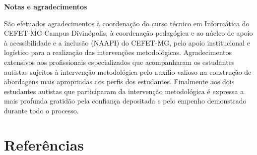 \documentclass[
  12pt,
  a4paper,
]{article}
\begin{document}
\textbf{Notas e agradecimentos}

São efetuados agradecimentos à coordenação do curso técnico em
Informática do CEFET-MG Campus Divinópolis, à coordenação pedagógica e
ao núcleo de apoio à acessibilidade e a inclusão (NAAPI) do CEFET-MG,
pelo apoio institucional e logístico para a realização das intervenções
metodológicas. Agradecimentos extensivos aos profissionais
especializados que acompanharam os estudantes autistas sujeitos à
intervenção metodológica pelo auxílio valioso na construção de
abordagens mais apropriadas aos perfis dos estudantes. Finalmente aos
dois estudantes autistas que participaram da intervenção metodológica é
expressa a mais profunda gratidão pela confiança depositada e pelo
empenho demonstrado durante todo o processo.

\hypertarget{bibliography}{%
\section*{Referências}\label{bibliography}}
\end{document}
